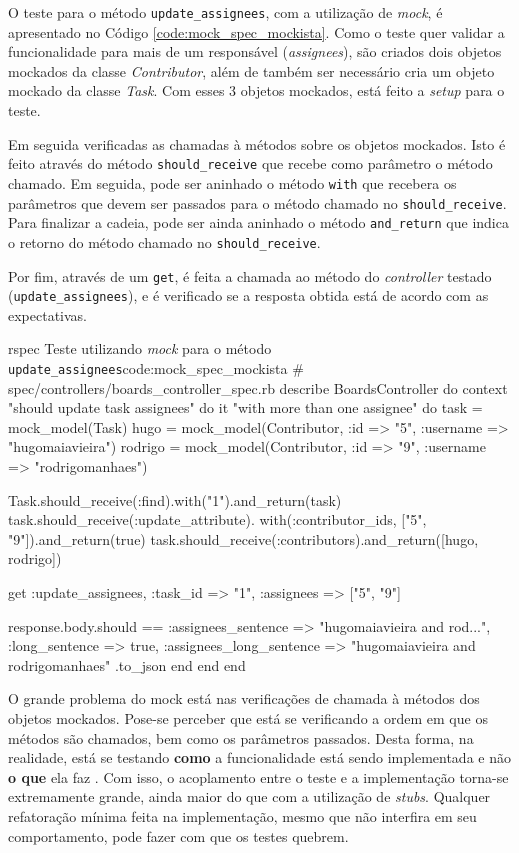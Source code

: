 O teste para o método \texttt{update\_assignees}, com a utilização de \textit{mock}, é apresentado no Código \ref{code:mock_spec_mockista}. Como o teste quer validar a funcionalidade para mais de um responsável (\textit{assignees}), são criados dois objetos mockados da classe \textit{Contributor}, além de também ser necessário cria um objeto mockado da classe \textit{Task}. Com esses 3 objetos mockados, está feito a \textit{setup} para o teste.

Em seguida verificadas as chamadas à métodos sobre os objetos mockados. Isto é feito através do método \texttt{should\_receive} que recebe como parâmetro o método chamado. Em seguida, pode ser aninhado o método \texttt{with} que recebera os parâmetros que devem ser passados para o método chamado no \texttt{should\_receive}. Para finalizar a cadeia, pode ser ainda aninhado o método \texttt{and\_return} que indica o retorno do método chamado no \texttt{should\_receive}.

Por fim, através de um \texttt{get}, é feita a chamada ao método do \textit{controller} testado (\texttt{update\_assignees}), e é verificado se a resposta obtida está de acordo com as expectativas.

\begin{mycode}{rspec}%
{Teste utilizando \textit{mock} para o método \texttt{update\_assignees}}{code:mock_spec_mockista}
# spec/controllers/boards_controller_spec.rb
describe BoardsController do
  context "should update task assignees" do
    it "with more than one assignee" do
      task = mock_model(Task)
      hugo = mock_model(Contributor, :id => "5", :username => "hugomaiavieira")
      rodrigo = mock_model(Contributor, :id => "9", :username => "rodrigomanhaes")

      Task.should_receive(:find).with("1").and_return(task)
      task.should_receive(:update_attribute).
        with(:contributor_ids, ["5", "9"]).and_return(true)
      task.should_receive(:contributors).and_return([hugo, rodrigo])

      get :update_assignees, :task_id => "1", :assignees => ["5", "9"]

      response.body.should ==
        { :assignees_sentence => "hugomaiavieira and rod...",
          :long_sentence => true,
          :assignees_long_sentence => "hugomaiavieira and rodrigomanhaes" }.to_json
    end
  end
end
\end{mycode}

O grande problema do mock está nas verificações de chamada à métodos dos objetos mockados. Pose-se perceber que está se verificando a ordem em que os métodos são chamados, bem como os parâmetros passados. Desta forma, na realidade, está se testando \textbf{como} a funcionalidade está sendo implementada e não \textbf{o que} ela faz \cite{UnitForAReason}. Com isso, o acoplamento entre o teste e a implementação torna-se extremamente grande, ainda maior do que com a utilização de \textit{stubs}. Qualquer refatoração mínima feita na implementação, mesmo que não interfira em seu comportamento, pode fazer com que os testes quebrem.

